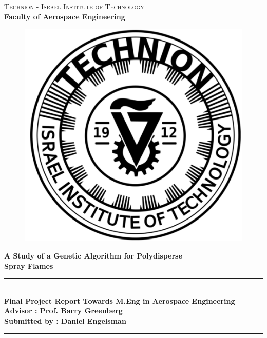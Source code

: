 \documentclass[12pt]{article}
\numberwithin{equation}{section}
\begin{document}
\begin{titlepage}
\newcommand{\HRule}{\rule{\linewidth}{0.5mm}}
\center
\textsc{\LARGE Technion - Israel Institute of Technology}\\[0.8cm]
{\Large \textbf{Faculty of Aerospace Engineering}}\\[2.3cm]
\begin{figure}[H]
\centering
\includegraphics[scale=0.2]{Logo_0.png}
\end{figure}

\vspace*{50px}
\textbf{{\Large A Study of a Genetic Algorithm for Polydisperse \\[0.5cm] Spray Flames}}

\vspace*{80px}

\HRule \\[0.3cm]
\textbf{Final Project Report Towards M.Eng in Aerospace Engineering}\\[0.2cm]
\textbf{Advisor : Prof. Barry Greenberg}\\[0.2cm]
\textbf{Submitted by : Daniel Engelsman}\\[0.2cm]
\HRule \\
\end{titlepage}
\end{document}
